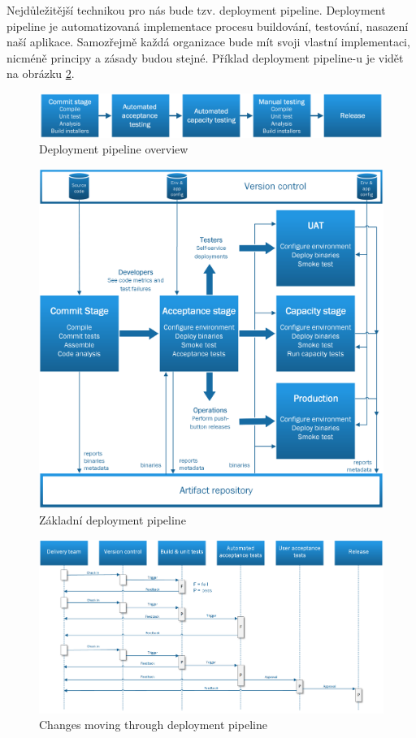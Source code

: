 Nejdůležitější technikou pro nás bude tzv. deployment pipeline. Deployment pipeline je automatizovaná implementace procesu buildování, testování, nasazení naší aplikace. Samozřejmě každá organizace bude mít svoji vlastní implementaci, nicméně principy a zásady budou stejné. Příklad deployment pipeline-u je vidět na obrázku \ref{fig:pipeline}.

\begin{figure}[]
  \centering
  \includegraphics[width=15cm]{fig/pipeline_overview.png}
  \caption{Deployment pipeline overview}
  \label{fig:pipeline_overview}
\end{figure}

\begin{figure}[]
  \centering
  \includegraphics[width=15cm]{fig/pipeline_basic.png}
  \caption{Základní deployment pipeline}
  \label{fig:pipeline}
\end{figure}

\begin{figure}[]
  \centering
  \includegraphics[width=15cm]{fig/pipeline_changes.png}
  \caption{Changes moving through deployment pipeline}
  \label{fig:pipeline_overview}
\end{figure}

